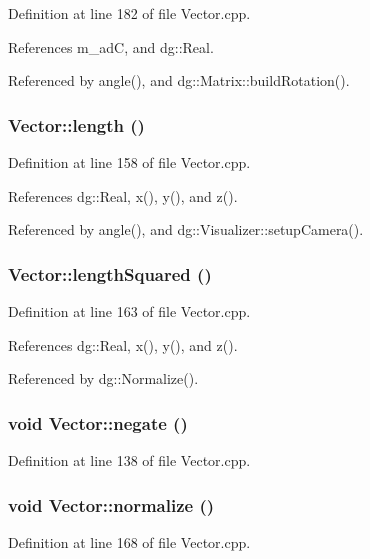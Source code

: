 Definition at line 182 of file Vector.cpp.

References m\_\-ad\-C, and dg::Real.

Referenced by angle(), and dg::Matrix::build\-Rotation().
\subsubsection{ Vector::length ()}\label{classdg_1_1Vector_a32}




Definition at line 158 of file Vector.cpp.

References dg::Real, x(), y(), and z().

Referenced by angle(), and dg::Visualizer::setup\-Camera().
\subsubsection{ Vector::length\-Squared ()}\label{classdg_1_1Vector_a33}




Definition at line 163 of file Vector.cpp.

References dg::Real, x(), y(), and z().

Referenced by dg::Normalize().
\subsubsection{\setlength{\rightskip}{0pt plus 5cm}void Vector::negate ()}\label{classdg_1_1Vector_a31}




Definition at line 138 of file Vector.cpp.
\subsubsection{\setlength{\rightskip}{0pt plus 5cm}void Vector::normalize ()}\label{classdg_1_1Vector_a34}




Definition at line 168 of file Vector.cpp.

